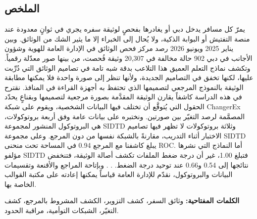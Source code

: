 \documentclass[12pt,a4paper]{article}
\newif\ifshowguidance
\newcommand{\todo}[1]{\ifshowguidance\leavevmode{\color{gray}\itshape [#1]}\fi}
\begin{document}
\onehalfspacing
\clearpage

\begin{otherlanguage}{arabic}
\section*{الملخص}
\end{otherlanguage}
\todo{Draft translation (10 Oct, second version) of the English abstract, at most 250 words. A native speaker must check it, especially the terms for travel document, forgery, first line, Document Examination Center, specimen and referral, and update it when the results are filled in.}
\medskip

\begin{otherlanguage}{arabic}
يمرّ كل مسافر يدخل دبي أو يغادرها بفحصٍ لوثيقة سفره يجري في ثوانٍ معدودة عند منصة التفتيش أو البوابة الذكية، ولا يُحال إلى الخبراء إلا ما يثير الشك من الوثائق. وبين يناير 2025 ويونيو 2026 رصد مركز فحص الوثائق في الإدارة العامة للهوية وشؤون الأجانب في دبي 902 حالة مخالفة في 20,307 وثيقة فُحصت، من بينها صور معدّلة رقمياً. وتكشف نماذج التعلم العميق هذا التلاعب بدقة شبه تامة في تصاميم الوثائق التي دُرِّبت عليها، لكنها تخفق في التصاميم الجديدة، ولأنها تنظر إلى صورة واحدة فلا يمكنها مطابقة الوثيقة بالنموذج المرجعي لتصميمها الذي تحتفظ به أجهزة القراءة في المنافذ. نقترح في هذه الدراسة كاشفاً يقارن الوثيقة المقدَّمة بصورة مرجعية لتصميمها وبقناعٍ يحدّد الحقول التي يُتوقَّع أن تختلف فيها البيانات الشخصية، ويقوم على شبكة ChangerEx المصمَّمة لرصد التغيّر بين صورتين. ونختبره على بيانات عامة وفق أربعة بروتوكولات، هي البروتوكول المنشور لمجموعة SIDTD وثلاثة بروتوكولات لا تظهر فيها تصاميم الاختبار أثناء التدريب، مقارنةً بالشبكة نفسها من دون المرجع. وعلى مجموعة SIDTD يبلغ كاشفنا مع المرجع 0.94 في المساحة تحت منحنى ROC. أما النماذج التي نشرها مؤلفو SIDTD فتبلغ 1.00، غير أن درجة ضغط الملفات تكشف أصالة الوثيقة، فتنخفض نتائجها إلى 0.54 و0.66 عند توحيد درجة الضغط. \todo{Gain over the control, Protocols B to D, referral rate}. \todo{CPU time}. وبإتاحة المراجع والأقنعة وتقسيمات البيانات والبروتوكول، نقدّم للإدارة العامة قياساً يمكنها إعادته على مكتبة القوالب الخاصة بها.

\textbf{الكلمات المفتاحية:} وثائق السفر، كشف التزوير، الكشف المشروط بالمرجع، كشف التغيّر، الشبكات التوأمية، مراقبة الحدود.
\end{otherlanguage}
\vspace{1.5em}
\end{document}
